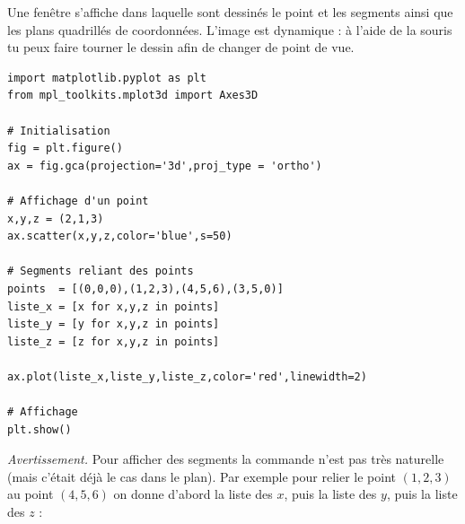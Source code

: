 \documentclass[11pt,class=report,crop=false]{standalone}
\begin{document}
\begin{cours}
Une fenêtre s'affiche dans laquelle sont dessinés le point et les segments ainsi que les plans quadrillés de coordonnées. L'image est dynamique : à l'aide de la souris tu peux faire tourner le dessin afin de changer de point de vue.

\begin{lstlisting}
import matplotlib.pyplot as plt
from mpl_toolkits.mplot3d import Axes3D

# Initialisation
fig = plt.figure()
ax = fig.gca(projection='3d',proj_type = 'ortho') 

# Affichage d'un point
x,y,z = (2,1,3)
ax.scatter(x,y,z,color='blue',s=50)

# Segments reliant des points
points  = [(0,0,0),(1,2,3),(4,5,6),(3,5,0)]
liste_x = [x for x,y,z in points]
liste_y = [y for x,y,z in points]
liste_z = [z for x,y,z in points]

ax.plot(liste_x,liste_y,liste_z,color='red',linewidth=2)

# Affichage
plt.show()
\end{lstlisting}


\emph{Avertissement.} Pour afficher des segments la commande  n'est pas très naturelle (mais c'était déjà le cas dans le plan). Par exemple pour relier le point $(1,2,3)$ au point $(4,5,6)$ on donne d'abord la liste des $x$, puis la liste des $y$, puis la liste des $z$ :

\end{cours}


\end{document}
